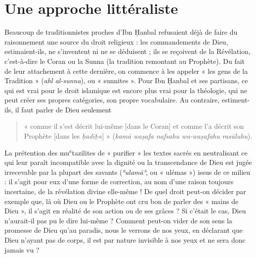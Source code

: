 \hypertarget{une-approche-littuxe9raliste}{%
\section{Une approche littéraliste}\label{une-approche-littuxe9raliste}}


Beaucoup de traditionnistes proches d'Ibn Ḥanbal refusaient déjà de
faire du raisonnement une source du droit religieux : les commandements
de Dieu, estimaient-ils, ne s'inventent ni ne se déduisent ; ils se
reçoivent de la Révélation, c'est-à-dire le Coran ou la Sunna (la
tradition remontant au Prophète). Du fait de leur attachement à cette
dernière, on commence à les appeler « les gens de la Tradition »
(\emph{ahl al-sunna}), ou « sunnites ». Pour Ibn Ḥanbal et ses
partisans, ce qui est vrai pour le droit islamique est encore plus vrai
pour la théologie, qui ne peut créer ses propres catégories, son propre
vocabulaire. Au contraire, estiment-ils, il faut parler de Dieu
seulement
\begin{quote}
    « comme il s'est décrit lui-même {[}dans le Coran{]}
et comme l'a décrit son Prophète {[}dans les \emph{ḥadīṯ}-s{]} »
(\emph{kamā waṣafa nafsahu wa-waṣafahu}
\emph{rasūluhu}).
\end{quote}

La prétention des muʿtazilites de « purifier » les textes sacrés en
neutralisant ce qui leur paraît incompatible avec la dignité ou la
transcendance de Dieu est jugée irrecevable par la plupart des savants
(\emph{ʿulamāʾ}, ou « ulémas ») issus de ce milieu : il s'agit pour eux
d'une forme de correction, au nom d'une raison toujours incertaine, de
la révélation divine elle-même ! De quel droit peut-on décider par
exemple que, là où Dieu ou le Prophète ont cru bon de parler des « mains
de Dieu », il s'agit en réalité de son action ou de ses grâces ? Si
c'était le cas, Dieu n'aurait-il pas pu le dire lui-même ? Comment
peut-on vider de son sens la promesse de Dieu qu'au paradis, nous le
verrons de nos yeux, en déclarant que Dieu n'ayant pas de corps, il est
par nature invisible à nos yeux et ne sera donc jamais vu ?

